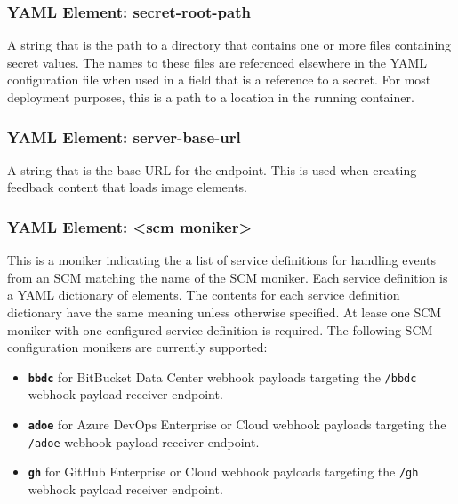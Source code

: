 
\subsubsection{YAML Element: secret-root-path}\label{sec:yaml-secret-root-path}

A string that is the path to a directory that contains one or more files containing secret values.  The names to these files are 
referenced elsewhere in the YAML configuration file when used in a field that is a reference to a secret.  For most deployment
purposes, this is a path to a location in the \cxoneflow running container.

\subsubsection{YAML Element: server-base-url}\label{sec:yaml-server-base-url}
A string that is the base URL for the \cxoneflow endpoint.  This is used when creating feedback content that loads image elements.

\subsubsection{YAML Element: <scm moniker>}\label{sec:yaml-scm-monikers}

This is a moniker indicating the a list of service definitions for handling events from an SCM matching the name of the SCM
moniker.  Each service definition is a YAML dictionary of elements. The contents for each service definition dictionary 
have the same meaning unless otherwise specified.  At lease one SCM moniker with one configured service definition is required. 
The following SCM configuration monikers are currently supported:

\begin{itemize}
    \item \textbf{\texttt{bbdc}} for BitBucket Data Center webhook payloads targeting the \texttt{/bbdc}
    webhook payload receiver endpoint.
    \item \textbf{\texttt{adoe}} for Azure DevOps Enterprise or Cloud webhook payloads targeting the \texttt{/adoe}
    webhook payload receiver endpoint.
    \item \textbf{\texttt{gh}} for GitHub Enterprise or Cloud webhook payloads targeting the \texttt{/gh}
    webhook payload receiver endpoint.
\end{itemize}

